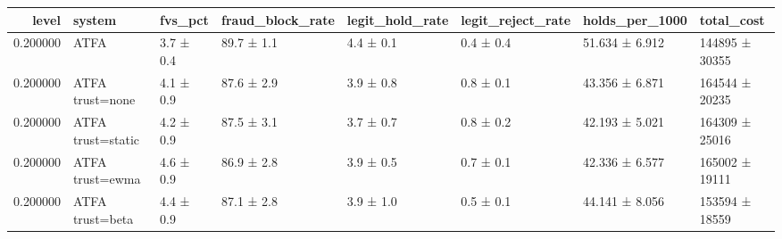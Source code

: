 \begin{tabular}{rlllllll}
\toprule
level & system & fvs\_pct & fraud\_block\_rate & legit\_hold\_rate & legit\_reject\_rate & holds\_per\_1000 & total\_cost \\
\midrule
0.200000 & ATFA & 3.7 ± 0.4 & 89.7 ± 1.1 & 4.4 ± 0.1 & 0.4 ± 0.4 & 51.634 ± 6.912 & 144895 ± 30355 \\
0.200000 & ATFA trust=none & 4.1 ± 0.9 & 87.6 ± 2.9 & 3.9 ± 0.8 & 0.8 ± 0.1 & 43.356 ± 6.871 & 164544 ± 20235 \\
0.200000 & ATFA trust=static & 4.2 ± 0.9 & 87.5 ± 3.1 & 3.7 ± 0.7 & 0.8 ± 0.2 & 42.193 ± 5.021 & 164309 ± 25016 \\
0.200000 & ATFA trust=ewma & 4.6 ± 0.9 & 86.9 ± 2.8 & 3.9 ± 0.5 & 0.7 ± 0.1 & 42.336 ± 6.577 & 165002 ± 19111 \\
0.200000 & ATFA trust=beta & 4.4 ± 0.9 & 87.1 ± 2.8 & 3.9 ± 1.0 & 0.5 ± 0.1 & 44.141 ± 8.056 & 153594 ± 18559 \\
\bottomrule
\end{tabular}
